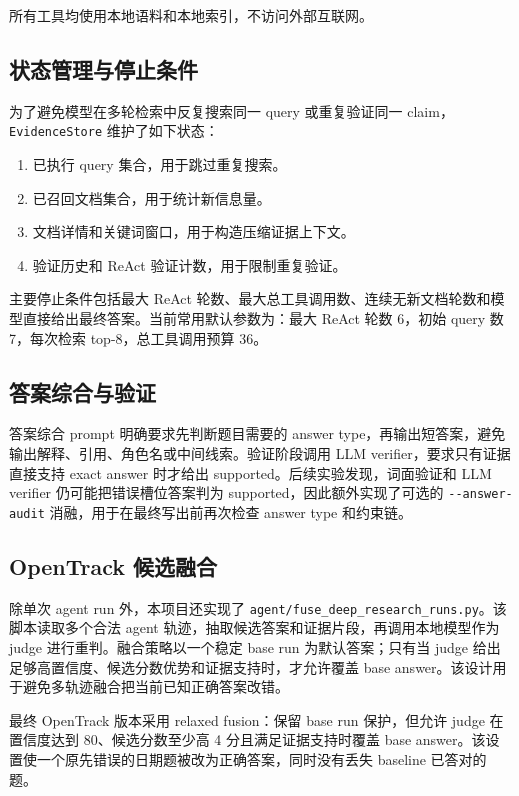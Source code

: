 \documentclass[a4paper]{article}
\begin{document}
所有工具均使用本地语料和本地索引，不访问外部互联网。

\subsection{状态管理与停止条件}

为了避免模型在多轮检索中反复搜索同一 query 或重复验证同一 claim，\verb|EvidenceStore| 维护了如下状态：

\begin{enumerate}
  \item 已执行 query 集合，用于跳过重复搜索。
  \item 已召回文档集合，用于统计新信息量。
  \item 文档详情和关键词窗口，用于构造压缩证据上下文。
  \item 验证历史和 ReAct 验证计数，用于限制重复验证。
\end{enumerate}

主要停止条件包括最大 ReAct 轮数、最大总工具调用数、连续无新文档轮数和模型直接给出最终答案。当前常用默认参数为：最大 ReAct 轮数 6，初始 query 数 7，每次检索 top-8，总工具调用预算 36。

\subsection{答案综合与验证}

答案综合 prompt 明确要求先判断题目需要的 answer type，再输出短答案，避免输出解释、引用、角色名或中间线索。验证阶段调用 LLM verifier，要求只有证据直接支持 exact answer 时才给出 supported。后续实验发现，词面验证和 LLM verifier 仍可能把错误槽位答案判为 supported，因此额外实现了可选的 \verb|--answer-audit| 消融，用于在最终写出前再次检查 answer type 和约束链。

\subsection{OpenTrack 候选融合}

除单次 agent run 外，本项目还实现了 \verb|agent/fuse_deep_research_runs.py|。该脚本读取多个合法 agent 轨迹，抽取候选答案和证据片段，再调用本地模型作为 judge 进行重判。融合策略以一个稳定 base run 为默认答案；只有当 judge 给出足够高置信度、候选分数优势和证据支持时，才允许覆盖 base answer。该设计用于避免多轨迹融合把当前已知正确答案改错。

最终 OpenTrack 版本采用 relaxed fusion：保留 base run 保护，但允许 judge 在置信度达到 80、候选分数至少高 4 分且满足证据支持时覆盖 base answer。该设置使一个原先错误的日期题被改为正确答案，同时没有丢失 baseline 已答对的题。
\end{document}
